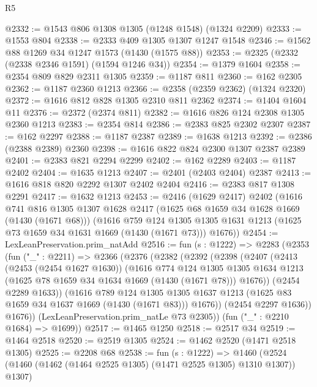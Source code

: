\begin{lexlean}{R5}
\begin{coremodule}
{{{{{{{{{{{{{{{{{{{{{{{{{{{{{{{{{{{{{{{{{{{{{{{{{{{{{{{{{{{{{{{{{{{{{{{{{{{{{{{{{{{{@2332 := @1543 @806 @1308 @1305 (@1248 @1548) (@1324 @2209)
@2333 := @1553 @804
@2338 := @2333 @409 @1305 @1307 @1247 @1548
@2346 := @1562 @88 @1269 @34 @1247 @1573 (@1430 (@1575 @88))
@2353 := @2325 (@2332 (@2338 @2346 @1591) (@1594 @1246 @34))
@2354 := @1379 @1604
@2358 := @2354 @809 @829 @2311 @1305
@2359 := @1187 @811
@2360 := @162 @2305
@2362 := @1187 @2360 @1213
@2366 := @2358 (@2359 @2362) (@1324 @2320)
@2372 := @1616 @812 @828 @1305 @2310 @811 @2362
@2374 := @1404 @1604 @11
@2376 := @2372 (@2374 @811)
@2382 := @1616 @826 @124 @2308 @1305 @2360 @1213
@2383 := @2354 @814
@2386 := @2383 @825 @2302 @2307
@2387 := @162 @2297
@2388 := @1187 @2387
@2389 := @1638 @1213
@2392 := @2386 (@2388 @2389) @2360
@2398 := @1616 @822 @824 @2300 @1307 @2387 @2389
@2401 := @2383 @821 @2294 @2299
@2402 := @162 @2289
@2403 := @1187 @2402
@2404 := @1635 @1213
@2407 := @2401 (@2403 @2404) @2387
@2413 := @1616 @818 @820 @2292 @1307 @2402 @2404
@2416 := @2383 @817 @1308 @2291
@2417 := @1632 @1213
@2453 := @2416
    (@1629 @2417)
    @2402
    (@1616
      @741
      @816
      @1305
      @1307
      @1628
      @2417
      (@1625 @68 @1659 @34 @1628 @1669 (@1430 (@1671 @68)))
      (@1616
        @759
        @124
        @1305
        @1305
        @1631
        @1213
        (@1625 @73 @1659 @34 @1631 @1669 (@1430 (@1671 @73)))
        @1676))
@2454 := LexLeanPreservation.prim_natAdd
@2516 := fun (s : @1222) =>
  @2283
    (@2353
      (fun ("_" : @2211) =>
      @2366
        (@2376
          (@2382
            (@2392
              (@2398
                (@2407
                  (@2413
                    (@2453 (@2454 @1627 @1630))
                    (@1616
                      @774
                      @124
                      @1305
                      @1305
                      @1634
                      @1213
                      (@1625 @78 @1659 @34 @1634 @1669 (@1430 (@1671 @78)))
                      @1676))
                  (@2454 @2289 @1633))
                (@1616
                  @789
                  @124
                  @1305
                  @1305
                  @1637
                  @1213
                  (@1625 @83 @1659 @34 @1637 @1669 (@1430 (@1671 @83)))
                  @1676))
              (@2454 @2297 @1636))
            @1676))
        (LexLeanPreservation.prim_natLe @73 @2305))
      (fun ("_" : @2210 @1684) => @1699))
@2517 := @1465 @1250
@2518 := @2517 @34
@2519 := @1464 @2518
@2520 := @2519 @1305
@2524 := @1462 @2520 (@1471 @2518 @1305)
@2525 := @2208 @68
@2538 := fun (s : @1222) =>
  @1460 (@2524 (@1460 (@1462 (@1464 @2525 @1305) (@1471 @2525 @1305) @1310 @1307)) @1307)
}}}}}}}}}}}}}}}}}}}}}}}}}}}}}}}}}}}}}}}}}}}}}}}}}}}}}}}}}}}}}}}}}}}}}}}}}}}}}}}}}}}}
\end{coremodule}
\end{lexlean}
